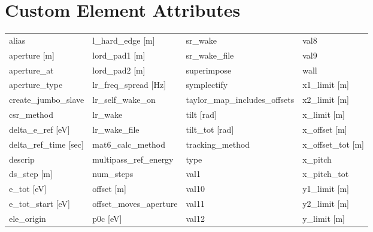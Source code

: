  \section{Custom Element Attributes}
 \label{s:list.custom}
 
 \begin{tabular}{llll} \toprule
alias                          & l_hard_edge [m]                & sr_wake                        & val8                           \\
aperture [m]                   & lord_pad1 [m]                  & sr_wake_file                   & val9                           \\
aperture_at                    & lord_pad2 [m]                  & superimpose                    & wall                           \\
aperture_type                  & lr_freq_spread [Hz]            & symplectify                    & x1_limit [m]                   \\
create_jumbo_slave             & lr_self_wake_on                & taylor_map_includes_offsets    & x2_limit [m]                   \\
csr_method                     & lr_wake                        & tilt [rad]                     & x_limit [m]                    \\
delta_e_ref [eV]               & lr_wake_file                   & tilt_tot [rad]                 & x_offset [m]                   \\
delta_ref_time [sec]           & mat6_calc_method               & tracking_method                & x_offset_tot [m]               \\
descrip                        & multipass_ref_energy           & type                           & x_pitch                        \\
ds_step [m]                    & num_steps                      & val1                           & x_pitch_tot                    \\
e_tot [eV]                     & offset [m]                     & val10                          & y1_limit [m]                   \\
e_tot_start [eV]               & offset_moves_aperture          & val11                          & y2_limit [m]                   \\
ele_origin                     & p0c [eV]                       & val12                          & y_limit [m]                    \\

\end{tabular}
